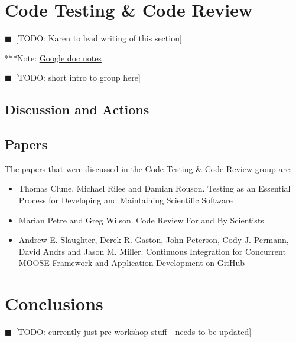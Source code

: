 \documentclass[11pt, oneside]{amsart}
\newcommand{\todo}[1]{{\color{blue}$\blacksquare$~\textsf{[TODO: #1]}}}
\newcommand{\note}[1]{ {\textcolor{blueish}    { ***Note:      #1 }}}
\begin{document}
\section{Code Testing \& Code Review} \label{sec:code_testing}
\todo{Karen to lead writing of this section}

\note{\href{http://tinyurl.com/l5t5h45}{Google doc notes}}

\todo{short intro to group here}

\subsection{Discussion and Actions}

\subsection{Papers}

The papers that were discussed in the Code Testing \& Code Review group are:
\begin{itemize}
\item Thomas Clune, Michael Rilee and Damian Rouson. Testing as an Essential
Process for Developing and Maintaining Scientific Software~\cite{wssspe2_clune}

\item Marian Petre and Greg Wilson. Code Review For and By
Scientists~\cite{wssspe2_petre}

\item Andrew E. Slaughter, Derek R. Gaston, John Peterson, Cody J. Permann,
David Andrs and Jason M. Miller. Continuous Integration for Concurrent {MOOSE}
Framework and Application Development on {GitHub}~\cite{wssspe2_slaughter}
\end{itemize}

\section{Conclusions} \label{sec:conclusions}
\todo{currently just pre-workshop stuff - needs to be updated}
\end{document}
